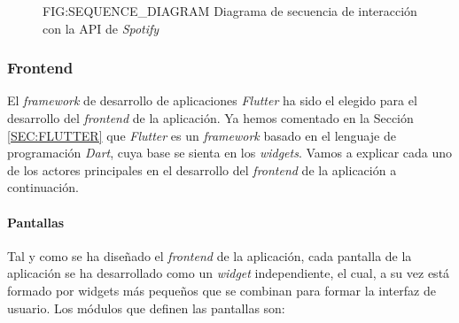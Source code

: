 \begin{figure}[Diagrama de secuencia de interacción con la API de \textit{Spotify}]{FIG:SEQUENCE_DIAGRAM}
    {Diagrama de secuencia de interacción con la API de \textit{Spotify}}
\end{figure}



\subsubsection{Frontend\label{subsec:frontend}}

El \textit{framework} de desarrollo de aplicaciones \textit{Flutter} \cite{flutter} ha sido el elegido para el desarrollo del \textit{frontend} de la aplicación. Ya hemos
comentado en la Sección \ref{SEC:FLUTTER} que \textit{Flutter} es un \textit{framework} basado en el lenguaje de programación \textit{Dart}, cuya base se sienta
en los \textit{widgets}. Vamos a explicar cada uno de los actores principales en el desarrollo del \textit{frontend} de la aplicación a continuación.

\paragraph{Pantallas}

Tal y como se ha diseñado el \textit{frontend} de la aplicación, cada pantalla de la aplicación se ha desarrollado como un \textit{widget} independiente, 
el cual, a su vez está formado por widgets más pequeños que se combinan para formar la interfaz de usuario. Los módulos que definen las pantallas son:

